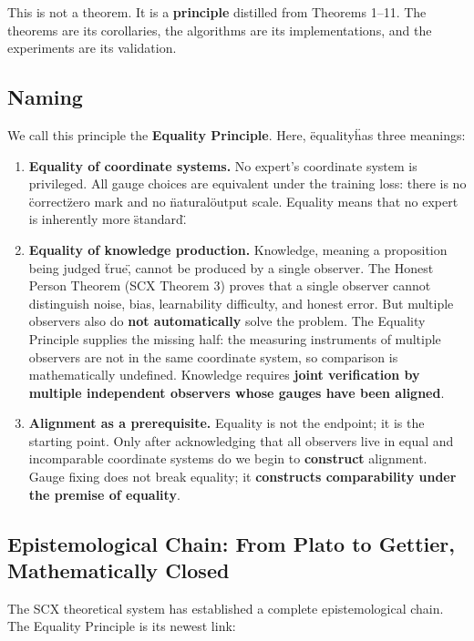 \documentclass[12pt,a4paper]{article}
\theoremstyle{remark}
\begin{document}
This is not a theorem. It is a \textbf{principle} distilled from Theorems 1--11. The theorems are its corollaries, the algorithms are its implementations, and the experiments are its validation.

\subsection{Naming}

We call this principle the \textbf{Equality Principle}. Here, \"equality\" has three meanings:

\begin{enumerate}[label=(\arabic*)]
    \item \textbf{Equality of coordinate systems.} No expert's coordinate system is privileged. All gauge choices are equivalent under the training loss: there is no \"correct\" zero mark and no \"natural\" output scale. Equality means that no expert is inherently more \"standard\".
    \item \textbf{Equality of knowledge production.} Knowledge, meaning a proposition being judged \"true\", cannot be produced by a single observer. The Honest Person Theorem (SCX Theorem 3) proves that a single observer cannot distinguish noise, bias, learnability difficulty, and honest error. But multiple observers also do \textbf{not automatically} solve the problem. The Equality Principle supplies the missing half: the measuring instruments of multiple observers are not in the same coordinate system, so comparison is mathematically undefined. Knowledge requires \textbf{joint verification by multiple independent observers whose gauges have been aligned}.
    \item \textbf{Alignment as a prerequisite.} Equality is not the endpoint; it is the starting point. Only after acknowledging that all observers live in equal and incomparable coordinate systems do we begin to \textbf{construct} alignment. Gauge fixing does not break equality; it \textbf{constructs comparability under the premise of equality}.
\end{enumerate}

\subsection{Epistemological Chain: From Plato to Gettier, Mathematically Closed}

The SCX theoretical system has established a complete epistemological chain. The Equality Principle is its newest link:
\end{document}
